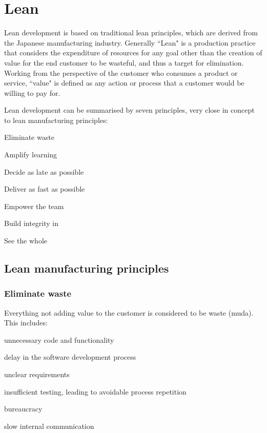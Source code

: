 \section{Lean}

Lean development is based on traditional lean principles, which are derived from the Japanese manufacturing industry. Generally ``Lean" is a production practice that considers the expenditure of resources for any goal other than the creation of value for the end customer to be wasteful, and thus a target for elimination. Working from the perspective of the customer who consumes a product or service, ``value" is defined as any action or process that a customer would be willing to pay for.

Lean development can be summarised by seven principles, very close in concept to lean manufacturing principles:
\begin{compactenum}
\item Eliminate waste
\item Amplify learning
\item Decide as late as possible
\item Deliver as fast as possible
\item Empower the team
\item Build integrity in
\item See the whole
\end{compactenum}

\subsection{Lean manufacturing principles}

\subsubsection{Eliminate waste}
Everything not adding value to the customer is considered to be waste (muda). This includes:
\begin{compactenum}
\item unnecessary code and functionality
\item delay in the software development process
\item unclear requirements
\item insufficient testing, leading to avoidable process repetition
\item bureaucracy
\item slow internal communication
\end{compactenum}

